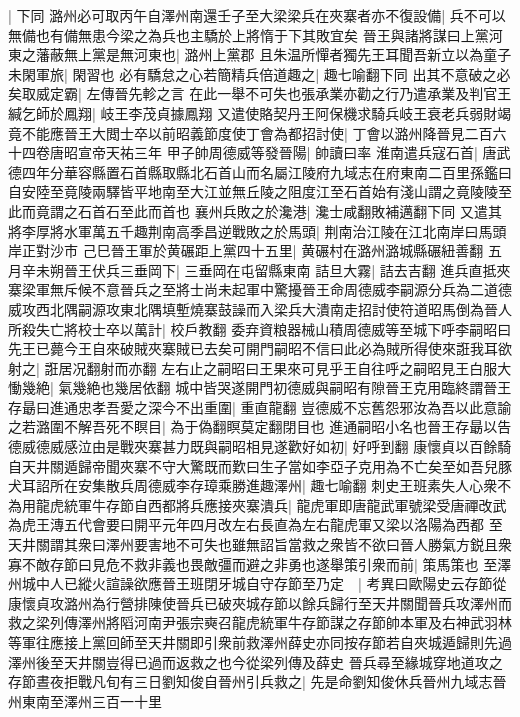 |{
	下同}
潞州必可取丙午自澤州南還壬子至大梁梁兵在夾寨者亦不復設備|{
	兵不可以無備也有備無患今梁之為兵也主驕於上將惰于下其敗宜矣}
晉王與諸將謀曰上黨河東之藩蔽無上黨是無河東也|{
	潞州上黨郡}
且朱温所憚者獨先王耳聞吾新立以為童子未閑軍旅|{
	閑習也}
必有驕怠之心若簡精兵倍道趣之|{
	趣七喻翻下同}
出其不意破之必矣取威定霸|{
	左傳晉先軫之言}
在此一舉不可失也張承業亦勸之行乃遣承業及判官王緘乞師於鳳翔|{
	岐王李茂貞據鳳翔}
又遣使賂契丹王阿保機求騎兵岐王衰老兵弱財竭竟不能應晉王大閲士卒以前昭義節度使丁會為都招討使|{
	丁會以潞州降晉見二百六十四卷唐昭宣帝天祐三年}
甲子帥周德威等發晉陽|{
	帥讀曰率}
淮南遣兵寇石首|{
	唐武德四年分華容縣置石首縣取縣北石首山而名屬江陵府九域志在府東南二百里孫鑑曰自安陸至竟陵兩驛皆平地南至大江並無丘陵之阻度江至石首始有淺山謂之竟陵陵至此而竟謂之石首石至此而首也}
襄州兵敗之於瀺港|{
	瀺士咸翻敗補邁翻下同}
又遣其將李厚將水軍萬五千趣荆南高季昌逆戰敗之於馬頭|{
	荆南治江陵在江北南岸曰馬頭岸正對沙市}
己巳晉王軍於黄碾距上黨四十五里|{
	黄碾村在潞州潞城縣碾紐善翻}
五月辛未朔晉王伏兵三垂岡下|{
	三垂岡在屯留縣東南}
詰旦大霧|{
	詰去吉翻}
進兵直抵夾寨梁軍無斥候不意晉兵之至將士尚未起軍中驚擾晉王命周德威李嗣源分兵為二道德威攻西北隅嗣源攻東北隅填塹燒寨鼓譟而入梁兵大潰南走招討使符道昭馬倒為晉人所殺失亡將校士卒以萬計|{
	校戶教翻}
委弃資粮器械山積周德威等至城下呼李嗣昭曰先王已薨今王自來破賊夾寨賊已去矣可開門嗣昭不信曰此必為賊所得使來誑我耳欲射之|{
	誑居况翻射而亦翻}
左右止之嗣昭曰王果來可見乎王自往呼之嗣昭見王白服大慟幾絶|{
	氣幾絶也幾居依翻}
城中皆哭遂開門初德威與嗣昭有隙晉王克用臨終謂晉王存朂曰進通忠孝吾愛之深今不出重圍|{
	重直龍翻}
豈德威不忘舊怨邪汝為吾以此意諭之若潞圍不解吾死不瞑目|{
	為于偽翻瞑莫定翻閉目也}
進通嗣昭小名也晉王存朂以告德威德威感泣由是戰夾寨甚力既與嗣昭相見遂歡好如初|{
	好呼到翻}
康懷貞以百餘騎自天井關遁歸帝聞夾寨不守大驚既而歎曰生子當如李亞子克用為不亡矣至如吾兒豚犬耳詔所在安集散兵周德威李存璋乘勝進趣澤州|{
	趣七喻翻}
刺史王班素失人心衆不為用龍虎統軍牛存節自西都將兵應接夾寨潰兵|{
	龍虎軍即唐龍武軍號梁受唐禪改武為虎王漙五代會要曰開平元年四月改左右長直為左右龍虎軍又梁以洛陽為西都}
至天井關謂其衆曰澤州要害地不可失也雖無詔旨當救之衆皆不欲曰晉人勝氣方鋭且衆寡不敵存節曰見危不救非義也畏敵彊而避之非勇也遂舉策引衆而前|{
	策馬策也}
至澤州城中人已縱火諠譟欲應晉王班閉牙城自守存節至乃定　|{
	考異曰歐陽史云存節從康懷貞攻潞州為行營排陳使晉兵已破夾城存節以餘兵歸行至天井關聞晉兵攻澤州而救之梁列傳澤州將䧟河南尹張宗奭召龍虎統軍牛存節謀之存節帥本軍及右神武羽林等軍往應接上黨回師至天井關即引衆前救澤州薛史亦同按存節若自夾城遁歸則先過澤州後至天井關豈得已過而返救之也今從梁列傳及薛史}
晉兵尋至緣城穿地道攻之存節晝夜拒戰凡旬有三日劉知俊自晉州引兵救之|{
	先是命劉知俊休兵晉州九域志晉州東南至澤州三百一十里}

